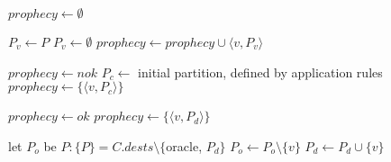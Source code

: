 \begin{algorithm}[h!]
\small

\begin{distribalgo}[1]

\vspace{1.5mm}


    \vspace{1.5mm}


    \vspace{1.5mm}

            \STATE $prophecy \leftarrow \emptyset$

                        \STATE $P_v \leftarrow P$
                    \ELSE
                        \STATE $P_v \leftarrow \emptyset$
                    \ENDIF
                    \STATE $prophecy \leftarrow prophecy \cup \langle v, P_v \rangle$
                \ENDFOR

                    \STATE $prophecy \leftarrow nok$
                \ELSE
                    \STATE $P_c \leftarrow$ initial partition, defined by application rules
                    \STATE $prophecy \leftarrow \{\langle v, P_c \rangle \}$
                \ENDIF

                    \STATE $prophecy \leftarrow ok$
                \ELSE
                    \STATE $prophecy \leftarrow \{\langle v, P_d \rangle \}$
                \ENDIF
                
            \ENDIF

        \vspace{1.5mm}

            \STATE let $P_o$ be $P : \{P\} = C.dests \setminus \{$oracle, $P_d\}$
                \STATE $P_o \leftarrow P_o \setminus \{v\}$
                \STATE $P_d \leftarrow P_d \cup      \{v\}$
            \ENDIF

        \vspace{1.0mm}
    

\end{distribalgo}
\end{algorithm}
